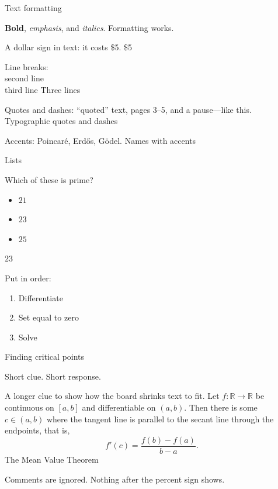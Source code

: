 \documentclass{article}
\newcommand{\R}{\mathbb{R}}
\begin{document}
\begin{category}{Text formatting}
  \begin{clue}
    \textbf{Bold}, \emph{emphasis}, and \textit{italics}.
  \response
    Formatting works.
  \end{clue}
  \begin{clue}
    A dollar sign in text: it costs \$5.
  \response
    \$5
  \end{clue}
  \begin{clue}
    Line breaks:\\ second line\\ third line
  \response
    Three lines
  \end{clue}
  \begin{clue}
    Quotes and dashes: ``quoted'' text, pages 3--5, and a pause---like this.
  \response
    Typographic quotes and dashes
  \end{clue}
  \begin{clue}
    Accents: Poincar\'e, Erd\H{o}s, G\"odel.
  \response
    Names with accents
  \end{clue}
\end{category}

\begin{category}{Lists}
  \begin{clue}
    Which of these is prime?
    \begin{itemize}
      \item $21$
      \item $23$
      \item $25$
    \end{itemize}
  \response
    $23$
  \end{clue}
  \begin{clue}
    Put in order:
    \begin{enumerate}
      \item Differentiate
      \item Set equal to zero
      \item Solve
    \end{enumerate}
  \response
    Finding critical points
  \end{clue}
  \begin{clue}
    Short clue.
  \response
    Short response.
  \end{clue}
  \begin{clue}
    A longer clue to show how the board shrinks text to fit. Let
    $f:\R \to \R$ be continuous on $[a,b]$ and differentiable on $(a,b).$
    Then there is some $c \in (a,b)$ where the tangent line is parallel
    to the secant line through the endpoints, that is,
    \[ f'(c) = \frac{f(b) - f(a)}{b - a}. \]
  \response
    The Mean Value Theorem
  \end{clue}
  \begin{clue}
    Comments are ignored. %
  \response
    Nothing after the percent sign shows.
  \end{clue}
\end{category}
\end{document}
